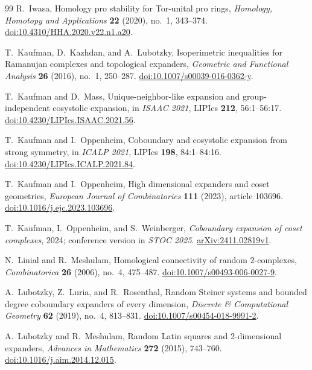 \begin{thebibliography}{99}
R.~Iwasa,
Homology pro stability for Tor-unital pro rings,
\emph{Homology, Homotopy and Applications} \textbf{22} (2020), no.~1, 343--374.
\href{https://doi.org/10.4310/HHA.2020.v22.n1.a20}{doi:10.4310/HHA.2020.v22.n1.a20}.

T.~Kaufman, D.~Kazhdan, and A.~Lubotzky,
Isoperimetric inequalities for Ramanujan complexes and topological expanders,
\emph{Geometric and Functional Analysis} \textbf{26} (2016), no.~1, 250--287.
\href{https://doi.org/10.1007/s00039-016-0362-y}{doi:10.1007/s00039-016-0362-y}.

T.~Kaufman and D.~Mass,
Unique-neighbor-like expansion and group-independent cosystolic expansion,
in \emph{ISAAC 2021}, LIPIcs \textbf{212}, 56:1--56:17.
\href{https://doi.org/10.4230/LIPIcs.ISAAC.2021.56}{doi:10.4230/LIPIcs.ISAAC.2021.56}.

T.~Kaufman and I.~Oppenheim,
Coboundary and cosystolic expansion from strong symmetry,
in \emph{ICALP 2021}, LIPIcs \textbf{198}, 84:1--84:16.
\href{https://doi.org/10.4230/LIPIcs.ICALP.2021.84}{doi:10.4230/LIPIcs.ICALP.2021.84}.

T.~Kaufman and I.~Oppenheim,
High dimensional expanders and coset geometries,
\emph{European Journal of Combinatorics} \textbf{111} (2023), article 103696.
\href{https://doi.org/10.1016/j.ejc.2023.103696}{doi:10.1016/j.ejc.2023.103696}.

T.~Kaufman, I.~Oppenheim, and S.~Weinberger,
\emph{Coboundary expansion of coset complexes}, 2024;
conference version in \emph{STOC 2025}.
\href{https://arxiv.org/abs/2411.02819v1}{arXiv:2411.02819v1}.

N.~Linial and R.~Meshulam,
Homological connectivity of random 2-complexes,
\emph{Combinatorica} \textbf{26} (2006), no.~4, 475--487.
\href{https://doi.org/10.1007/s00493-006-0027-9}{doi:10.1007/s00493-006-0027-9}.

A.~Lubotzky, Z.~Luria, and R.~Rosenthal,
Random Steiner systems and bounded degree coboundary expanders of every dimension,
\emph{Discrete \& Computational Geometry} \textbf{62} (2019), no.~4, 813--831.
\href{https://doi.org/10.1007/s00454-018-9991-2}{doi:10.1007/s00454-018-9991-2}.

A.~Lubotzky and R.~Meshulam,
Random Latin squares and 2-dimensional expanders,
\emph{Advances in Mathematics} \textbf{272} (2015), 743--760.
\href{https://doi.org/10.1016/j.aim.2014.12.015}{doi:10.1016/j.aim.2014.12.015}.


\end{thebibliography}
